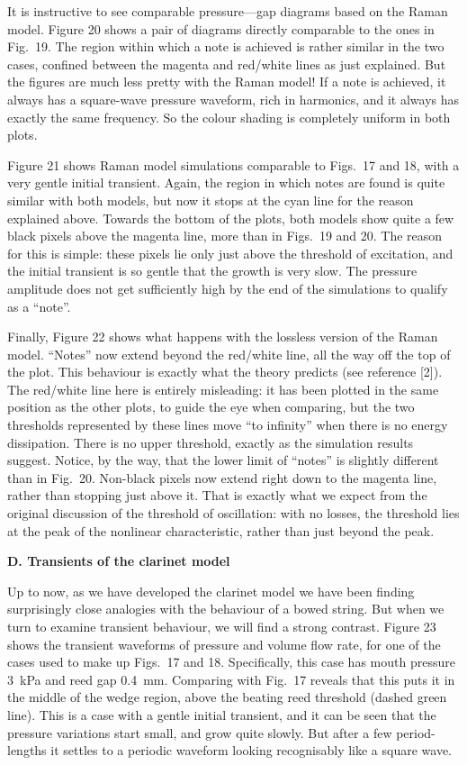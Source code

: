   It is instructive to see comparable pressure—gap diagrams based on the Raman 
  model. Figure 20 shows a pair of diagrams directly comparable to the ones in 
  Fig.\ 19. The region within which a note is achieved is rather similar in the 
  two cases, confined between the magenta and red/white lines as just 
  explained. But the figures are much less pretty with the Raman model! If a 
  note is achieved, it always has a square-wave pressure waveform, rich in 
  harmonics, and it always has exactly the same frequency. So the colour 
  shading is completely uniform in both plots. 

  Figure 21 shows Raman model simulations comparable to Figs.\ 17 and 18, with 
  a very gentle initial transient. Again, the region in which notes are found 
  is quite similar with both models, but now it stops at the cyan line for the 
  reason explained above. Towards the bottom of the plots, both models show 
  quite a few black pixels above the magenta line, more than in Figs.\ 19 and 
  20. The reason for this is simple: these pixels lie only just above the 
  threshold of excitation, and the initial transient is so gentle that the 
  growth is very slow. The pressure amplitude does not get sufficiently high by 
  the end of the simulations to qualify as a “note”. 

  Finally, Figure 22 shows what happens with the lossless version of the Raman 
  model. “Notes” now extend beyond the red/white line, all the way off the top 
  of the plot. This behaviour is exactly what the theory predicts (see 
  reference [2]). The red/white line here is entirely misleading: it has been 
  plotted in the same position as the other plots, to guide the eye when 
  comparing, but the two thresholds represented by these lines move “to 
  infinity” when there is no energy dissipation. There is no upper threshold, 
  exactly as the simulation results suggest. Notice, by the way, that the lower 
  limit of “notes” is slightly different than in Fig.\ 20. Non-black pixels now 
  extend right down to the magenta line, rather than stopping just above it. 
  That is exactly what we expect from the original discussion of the threshold 
  of oscillation: with no losses, the threshold lies at the peak of the 
  nonlinear characteristic, rather than just beyond the peak. 

  \textbf{D. Transients of the clarinet model} 

  Up to now, as we have developed the clarinet model we have been finding 
  surprisingly close analogies with the behaviour of a bowed string. But when 
  we turn to examine transient behaviour, we will find a strong contrast. 
  Figure 23 shows the transient waveforms of pressure and volume flow rate, for 
  one of the cases used to make up Figs.\ 17 and 18. Specifically, this case 
  has mouth pressure 3~kPa and reed gap 0.4~mm. Comparing with Fig.\ 17 reveals 
  that this puts it in the middle of the wedge region, above the beating reed 
  threshold (dashed green line). This is a case with a gentle initial 
  transient, and it can be seen that the pressure variations start small, and 
  grow quite slowly. But after a few period-lengths it settles to a periodic 
  waveform looking recognisably like a square wave. 

